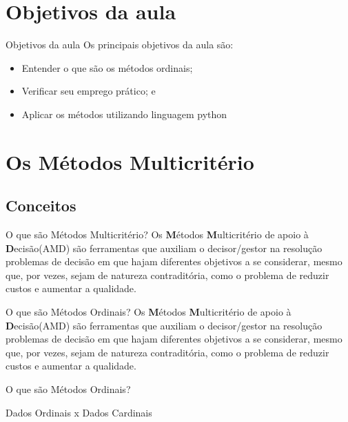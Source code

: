 \documentclass[aspectratio=169]{beamer}
\begin{document}
\section{Objetivos da aula}
\begin{frame}{Objetivos da aula}
    Os principais objetivos da aula são:
    \begin{itemize}[<+- | uncover@+>]
        \item Entender o que são os métodos ordinais;
        \item Verificar seu emprego prático; e
        \item \alert{Aplicar os métodos utilizando linguagem python}
    \end{itemize}
\end{frame}

\section{Os Métodos Multicritério}
\subsection{Conceitos}
\begin{frame}{O que são Métodos Multicritério?}
Os \textbf{M}étodos \textbf{M}ulticritério de apoio à \textbf{D}ecisão(AMD) são ferramentas que auxiliam o decisor/gestor na resolução problemas de decisão em que hajam diferentes objetivos a se considerar, mesmo que, por vezes, sejam de natureza contraditória, como o problema de reduzir custos e aumentar a qualidade. \cite{Almeida2011}
\end{frame}

\begin{frame}{O que são Métodos Ordinais?}
Os \textbf{M}étodos \textbf{M}ulticritério de apoio à \textbf{D}ecisão(AMD)
são ferramentas que auxiliam o decisor/gestor na resolução problemas de decisão em que hajam diferentes objetivos a se considerar, mesmo que, por vezes, sejam de natureza contraditória, como o problema de reduzir custos e aumentar a qualidade. \cite{Almeida2011}
\end{frame}

\begin{frame}{O que são Métodos Ordinais?}
    \begin{block}{}
        Dados Ordinais x Dados Cardinais
    \end{block}
\end{frame}
\end{document}
